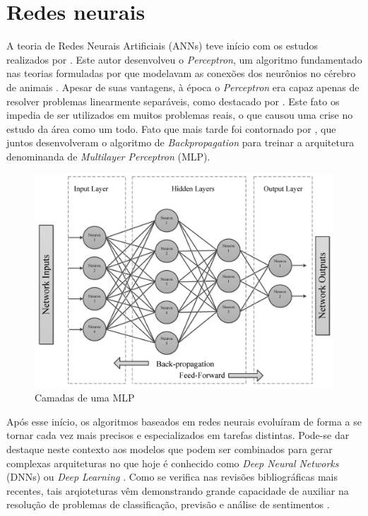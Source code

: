 \section{Redes neurais} \label{sec:redes neurais}

A teoria de Redes Neurais Artificiais (ANNs) teve início com os estudos realizados por \textcite{Rosenblatt}.
Este autor desenvolveu o \textit{Perceptron}, um algoritmo fundamentado nas teorias formuladas por \textcite{McCulloch, hebb} que modelavam as conexões dos neurônios no cérebro de animais \cite{Good}.
Apesar de suas vantagens, à época o \textit{Perceptron} era capaz apenas de resolver problemas linearmente separáveis, como destacado por \textcite{Minsky}. Este fato os impedia de ser utilizados em muitos problemas reais,
o que causou uma crise no estudo da área como um todo. Fato que mais tarde foi contornado por \textcite{Rumelhart}, que juntos desenvolveram o algoritmo de \textit{Backpropagation} para treinar a arquitetura denominanda de \textit{Multilayer Perceptron} (MLP).

\begin{figure}[!htb] \centering
  \caption{Camadas de uma MLP} \label{figura:multilayer}
  \begin{varwidth}{\linewidth}
    \includegraphics[width=12cm]{figuras/mlp.png}
  \end{varwidth}
\end{figure}

Após esse início, os algoritmos baseados em redes neurais evoluíram de forma a se tornar cada vez mais precisos e especializados em tarefas distintas.
Pode-se dar destaque neste contexto aos modelos
que podem ser combinados para gerar complexas arquiteturas no que hoje é conhecido como \textit{Deep Neural Networks} (DNNs) ou \textit{Deep Learning} \cite{Good}. Como se verifica nas revisões bibliográficas mais recentes, tais arqioteturas vêm demonstrando grande capacidade de auxiliar na resolução de problemas de classificação, previsão e análise de sentimentos \cite{Hanc}.

